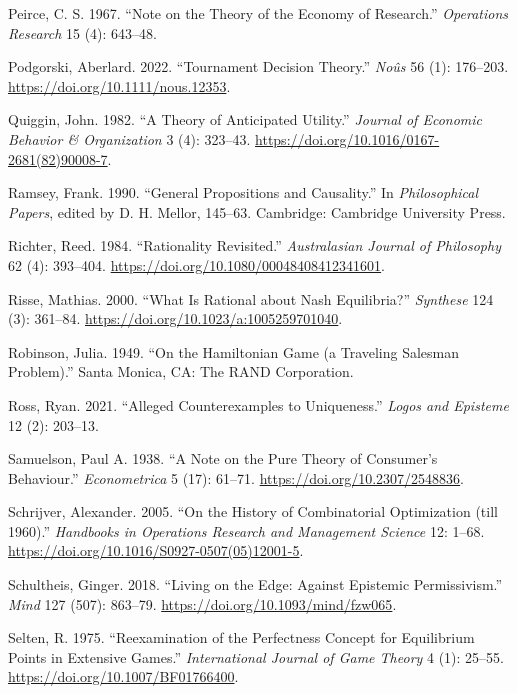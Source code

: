 \documentclass[
  12pt,
  letterpaper,
  DIV=11,
  numbers=noendperiod]{scrreprt}
\newlength{\cslhangindent}
\newenvironment{CSLReferences}[2] %
 {\begin{list}{}{%
  \setlength{\itemindent}{0pt}
  \setlength{\leftmargin}{0pt}
  \setlength{\parsep}{0pt}
  \ifodd #1
   \setlength{\leftmargin}{\cslhangindent}
   \setlength{\itemindent}{-1\cslhangindent}
  \fi
  \setlength{\itemsep}{#2\baselineskip}}}
 {\end{list}}
\begin{document}
\begin{CSLReferences}{1}{0}
Peirce, C. S. 1967. {``Note on the Theory of the Economy of Research.''}
\emph{Operations Research} 15 (4): 643--48.

Podgorski, Aberlard. 2022. {``Tournament Decision Theory.''}
\emph{No{û}s} 56 (1): 176--203.
\url{https://doi.org/10.1111/nous.12353}.

Quiggin, John. 1982. {``A Theory of Anticipated Utility.''}
\emph{Journal of Economic Behavior \& Organization} 3 (4): 323--43.
\url{https://doi.org/10.1016/0167-2681(82)90008-7}.

Ramsey, Frank. 1990. {``General Propositions and Causality.''} In
\emph{Philosophical Papers}, edited by D. H. Mellor, 145--63. Cambridge:
Cambridge University Press.

Richter, Reed. 1984. {``Rationality Revisited.''} \emph{Australasian
Journal of Philosophy} 62 (4): 393--404.
\url{https://doi.org/10.1080/00048408412341601}.

Risse, Mathias. 2000. {``What Is Rational about Nash Equilibria?''}
\emph{Synthese} 124 (3): 361--84.
\url{https://doi.org/10.1023/a:1005259701040}.

Robinson, Julia. 1949. {``On the Hamiltonian Game (a Traveling Salesman
Problem).''} Santa Monica, CA: The RAND Corporation.

Ross, Ryan. 2021. {``Alleged Counterexamples to Uniqueness.''}
\emph{Logos and Episteme} 12 (2): 203--13.

Samuelson, Paul A. 1938. {``A Note on the Pure Theory of Consumer's
Behaviour.''} \emph{Econometrica} 5 (17): 61--71.
\url{https://doi.org/10.2307/2548836}.

Schrijver, Alexander. 2005. {``On the History of Combinatorial
Optimization (till 1960).''} \emph{Handbooks in Operations Research and
Management Science} 12: 1--68.
\url{https://doi.org/10.1016/S0927-0507(05)12001-5}.

Schultheis, Ginger. 2018. {``Living on the Edge: Against Epistemic
Permissivism.''} \emph{Mind} 127 (507): 863--79.
\url{https://doi.org/10.1093/mind/fzw065}.

Selten, R. 1975. {``Reexamination of the Perfectness Concept for
Equilibrium Points in Extensive Games.''} \emph{International Journal of
Game Theory} 4 (1): 25--55. \url{https://doi.org/10.1007/BF01766400}.


\end{CSLReferences}
\end{document}
